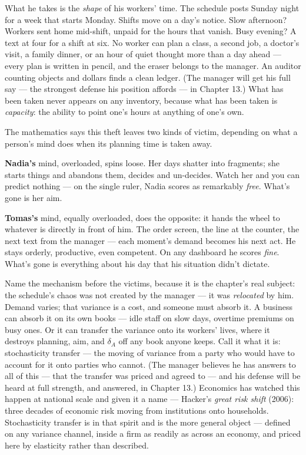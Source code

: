 What he takes is the \emph{shape} of his workers' time. The schedule posts
Sunday night for a week that starts Monday. Shifts move on a day's
notice. Slow afternoon? Workers sent home mid-shift, unpaid for the
hours that vanish. Busy evening? A text at four for a shift at six.
No worker can plan a class, a second job, a doctor's visit, a family
dinner, or an hour of quiet thought more than a day ahead --- every plan is written in
pencil, and the eraser belongs to the manager. An auditor counting
objects and dollars finds a clean ledger. (The manager will get his
full say --- the strongest defense his position affords --- in Chapter 13.) What has been taken never
appears on any inventory, because what has been taken is \emph{capacity}:
the ability to point one's hours at anything of one's own.


The mathematics says this theft leaves two kinds of victim, depending
on what a person's mind does when its planning time is taken away.

\textbf{Nadia's} mind, overloaded, spins loose. Her days shatter into
fragments; she starts things and abandons them, decides and
un-decides. Watch her and you can predict nothing --- on the single
ruler, Nadia scores as remarkably \emph{free}. What's gone is her aim.

\textbf{Tomas's} mind, equally overloaded, does the opposite: it hands the
wheel to whatever is directly in front of him. The order screen, the
line at the counter, the next text from the manager --- each moment's
demand becomes his next act. He stays orderly, productive, even
competent. On any dashboard he scores \emph{fine}. What's gone is
everything about his day that his situation didn't dictate.

Name the mechanism before the victims, because it is the chapter's
real subject: the schedule's chaos was not created by the manager --- it
was \emph{relocated} by him. Demand varies; that variance is a cost, and
someone must absorb it. A business can absorb it on its own books ---
idle staff on slow days, overtime premiums on busy ones. Or it can
transfer the variance onto its workers' lives, where it destroys
planning, aim, and \(\delta_A\) off any book anyone keeps. Call it what it is:
stochasticity transfer --- the moving of variance from a party who
would have to account for it onto parties who cannot. (The manager
believes he has answers to all of this --- that the transfer was priced
and agreed to --- and his defense will be heard at full strength, and
answered, in Chapter 13.) Economics has watched this happen at national scale and given it a name --- Hacker's \emph{great risk shift} (2006): three decades of economic risk moving from institutions onto households. Stochasticity transfer is in that spirit and is the more general object --- defined on any variance channel, inside a firm as readily as across an economy, and priced here by elasticity rather than described.

